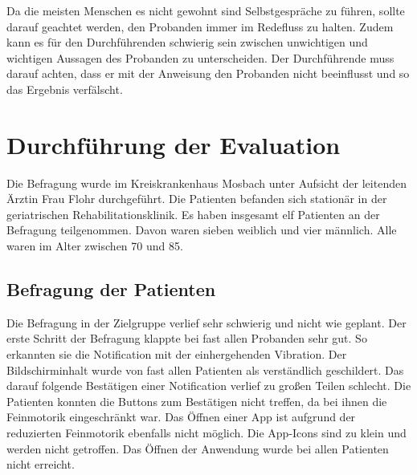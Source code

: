 Da die meisten Menschen es nicht gewohnt sind Selbstgespräche zu führen, sollte darauf geachtet werden, den Probanden immer im Redefluss zu halten. Zudem kann es für den Durchführenden schwierig sein zwischen unwichtigen und wichtigen Aussagen des Probanden zu unterscheiden. Der Durchführende muss darauf achten, dass er mit der Anweisung den Probanden nicht beeinflusst und so das Ergebnis verfälscht.

\section{Durchführung der Evaluation}
Die Befragung wurde im Kreiskrankenhaus Mosbach unter Aufsicht der leitenden Ärztin Frau Flohr durchgeführt. Die Patienten befanden sich stationär in der geriatrischen Rehabilitationsklinik. Es haben insgesamt elf Patienten  an der Befragung teilgenommen. Davon waren sieben weiblich und vier männlich. Alle waren im Alter zwischen 70 und 85. 

\subsection{Befragung der Patienten}

Die Befragung in der Zielgruppe verlief sehr schwierig und nicht wie geplant.
Der erste Schritt der Befragung klappte bei fast allen Probanden sehr gut. So erkannten sie die Notification mit der einhergehenden Vibration. Der Bildschirminhalt wurde von fast allen Patienten als verständlich geschildert. Das darauf folgende Bestätigen einer Notification verlief zu großen Teilen schlecht. Die Patienten konnten die Buttons zum Bestätigen nicht treffen, da bei ihnen die Feinmotorik eingeschränkt war.
Das Öffnen einer App ist aufgrund der reduzierten Feinmotorik ebenfalls nicht möglich. Die App-Icons sind zu klein und werden nicht getroffen. Das Öffnen der Anwendung wurde bei allen Patienten nicht erreicht.
